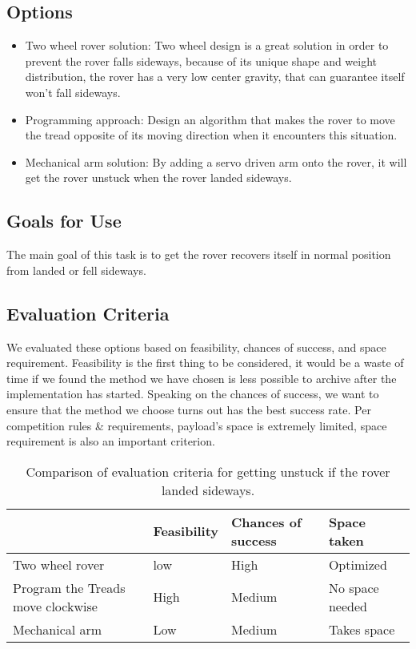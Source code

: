 \documentclass[10pt,serif,draftclsnofoot,onecolumn]{IEEEtran}
\begin{document}
\subsection{Options}
\begin{itemize}
	\item Two wheel rover solution: Two wheel design is a great solution in order to prevent the rover falls sideways, because of its unique shape and weight distribution, the rover has a very low center gravity, that can guarantee itself won't fall sideways.  
	\item Programming approach: Design an algorithm that makes the rover to move the tread opposite of its moving direction when it encounters this situation.
	\item Mechanical arm solution: By adding a servo driven arm onto the rover, it will get the rover unstuck when the rover landed sideways. 
	
\end{itemize}
\subsection{Goals for Use}
The main goal of this task is to get the rover recovers itself in normal position from landed or fell sideways. 
\subsection{Evaluation Criteria}
We evaluated these options based on feasibility, chances of success, and space requirement. Feasibility is the first thing to be considered, it would be a waste of time if we found the method we have chosen is less possible to archive after the implementation has started. Speaking on the chances of success, we want to ensure that the method we choose turns out has the best success rate. Per competition rules \& requirements, payload's space is extremely limited, space requirement is also an important criterion. 

\begin{table}[h!]
  \centering
  \caption{Comparison of evaluation criteria for getting unstuck if the rover landed sideways.}
  \label{tab:table1}
  \begin{tabular}{l|l|l|l}
			                             & Feasibility & Chances of success    & Space taken \\
    \hline
	Two wheel rover        				 & low         &  High                & Optimized \\
	\hline
    Program the Treads move clockwise    & High        & Medium		          &  No space needed \\
    \hline
	Mechanical arm 						 & Low         & Medium	              &  Takes space  \\
  \end{tabular}
\end{table}
\end{document}
